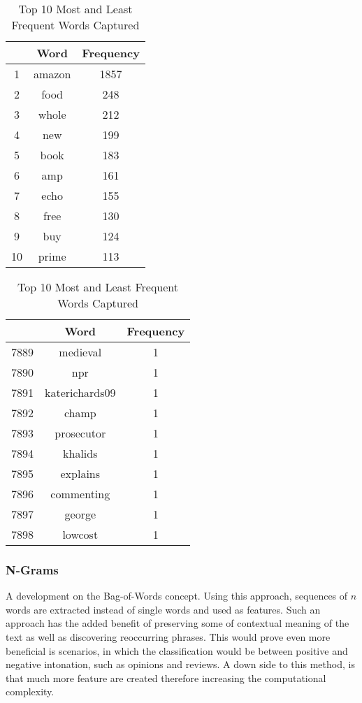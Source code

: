 			\begin{table}[H]
				\centering
				\begin{tabular}{ccc}
					\hline\hline
						&	Word 	& Frequency \\
					\hline
					1	&	amazon 	& 1857	\\
					2	&	food	& 248	\\	
					3	&	whole 	& 212	\\
					4	&	new		& 199	\\
					5	&	book	& 183	\\
					6	&	amp		& 161	\\
					7	&	echo 	& 155	\\
					8	&	free 	& 130	\\
					9	&	buy 	& 124	\\
					10	&	prime 	& 113	\\
					\hline\hline				
				\end{tabular}
				\qquad 
				\begin{tabular}{ccc}
					\hline\hline
					&	Word 	& Frequency \\
					\hline
					7889	&	medieval 		& 1	\\
					7890	&	npr				& 1	\\	
					7891	&	katerichards09 	& 1	\\
					7892	&	champ			& 1	\\
					7893	&	prosecutor		& 1	\\
					7894	&	khalids			& 1	\\
					7895	&	explains 		& 1	\\
					7896	&	commenting 		& 1	\\
					7897	&	george 			& 1	\\
					7898	&	lowcost 		& 1	\\
					\hline\hline				
				\end{tabular}
				\caption{Top 10 Most and Least Frequent Words Captured}
				\label{table:BOW_top_words}%
			\end{table}%
		
		\subsubsection{N-Grams}
			A development on the Bag-of-Words concept. Using this approach, sequences of $ n $ words are extracted instead of single words and used as features. Such an approach has the added benefit of preserving some of contextual meaning of the text as well as discovering reoccurring phrases. This would prove even more beneficial is scenarios, in which the classification would be between positive and negative intonation, such as opinions and reviews. A down side to this method, is that much more feature are created therefore increasing the computational complexity. 
			

